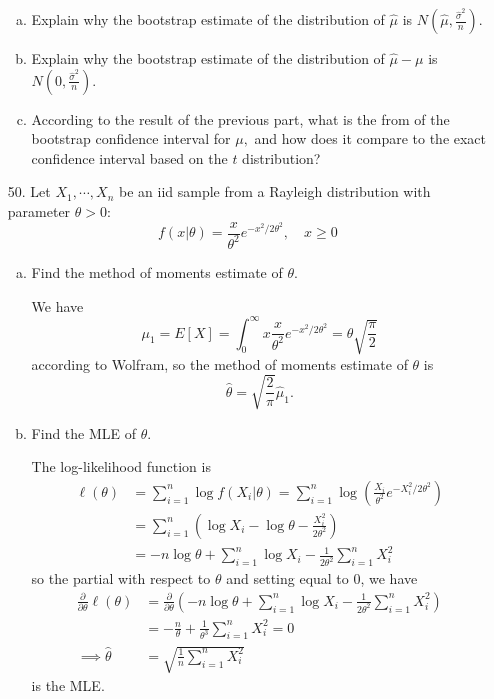 \documentclass{article}
\begin{document}
\begin{itemize}
		\begin{enumerate}[a.]
			\item Explain why the bootstrap estimate of the distribution of $\hat{\mu}$ is $N\left( \hat{\mu}, \frac{\hat{\sigma}^2}{n} \right).$

			\item Explain why the bootstrap estimate of the distribution of $\hat{\mu}-\mu$ is $N\left( 0, \frac{\hat{\sigma}^2}{n} \right).$

			\item According to the result of the previous part, what is the from of the bootstrap confidence interval for $\mu,$ and how does it compare to the exact confidence interval based on the $t$ distribution?
				
		\end{enumerate}

	\item[50.] Let $X_1,\cdots, X_n$ be an iid sample from a Rayleigh distribution with parameter $\theta>0$:\[f(x|\theta)=\frac{x}{\theta^2}e^{-x^2/2\theta^2}, \quad x\ge 0\]

		\begin{enumerate}[a.]
			\item Find the method of moments estimate of $\theta.$
				\begin{soln}
					We have \[\mu_1=E[X] = \int_0^\infty x\frac{x}{\theta^2}e^{-x^2/2\theta^2} = \theta\sqrt{\frac{\pi}{2}}\] according to Wolfram, so the method of moments estimate of $\theta$ is \[\hat{\theta}=\sqrt{\frac{2}{\pi}}\hat{\mu}_1.\]

				\end{soln}

			\item Find the MLE of $\theta.$
				\begin{soln}
					The log-likelihood function is 
					\begin{align*}
						\ell(\theta) &= \sum_{i=1}^{n} \log f(X_i|\theta)=\sum_{i=1}^{n}\log\left( \frac{X_i}{\theta^2}e^{-X_i^2/2\theta^2} \right) \\
						&= \sum_{i=1}^{n} \left( \log X_i - \log \theta - \frac{X_i^2}{2\theta^2} \right) \\
						&= -n\log \theta + \sum_{i=1}^{n} \log X_i - \frac{1}{2\theta^2}\sum_{i=1}^{n} X_i^2
					\end{align*} so the partial with respect to $\theta$ and setting equal to 0, we have
					\begin{align*}
						\frac{\partial}{\partial\theta}\ell(\theta) &= \frac{\partial}{\partial\theta}\left( -n\log \theta + \sum_{i=1}^{n} \log X_i - \frac{1}{2\theta^2}\sum_{i=1}^{n} X_i^2\right) \\
						&= -\frac{n}{\theta} + \frac{1}{\theta^3}\sum_{i=1}^{n}X_i^2 = 0 \\
						\implies \hat{\theta} &= \sqrt{\frac{1}{n}\sum_{i=1}^{n}X_i^2}
					\end{align*} is the MLE.
					

\end{soln}
\end{enumerate}
\end{itemize}
\end{document}
